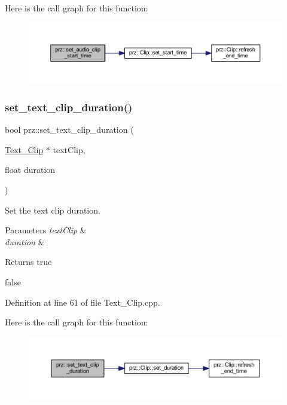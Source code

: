 Here is the call graph for this function\+:
\nopagebreak
\begin{figure}[H]
\begin{center}
\leavevmode
\includegraphics[width=350pt]{namespaceprz_ac8b09f14a5b58fe5ca2521460856443d_cgraph}
\end{center}
\end{figure}
\mbox{\label{namespaceprz_a0b38209c4d846727812a74f44085daef}} 
\subsubsection{\texorpdfstring{set\_text\_clip\_duration()}{set\_text\_clip\_duration()}}
{\footnotesize\ttfamily bool prz\+::set\+\_\+text\+\_\+clip\+\_\+duration (\begin{DoxyParamCaption}\item[{\mbox{\hyperlink{classprz_1_1_text___clip}{Text\+\_\+\+Clip}} $\ast$}]{text\+Clip,  }\item[{float}]{duration }\end{DoxyParamCaption})}



Set the text clip duration. 


\begin{DoxyParams}{Parameters}
{\em text\+Clip} & \\
\hline
{\em duration} & \\
\hline
\end{DoxyParams}
\begin{DoxyReturn}{Returns}
true 

false 
\end{DoxyReturn}


Definition at line 61 of file Text\+\_\+\+Clip.\+cpp.

Here is the call graph for this function\+:
\nopagebreak
\begin{figure}[H]
\begin{center}
\leavevmode
\includegraphics[width=350pt]{namespaceprz_a0b38209c4d846727812a74f44085daef_cgraph}
\end{center}
\end{figure}
\mbox{\label{namespaceprz_a0f13735aa236bd0a3aff7be58137e6a5}} 
